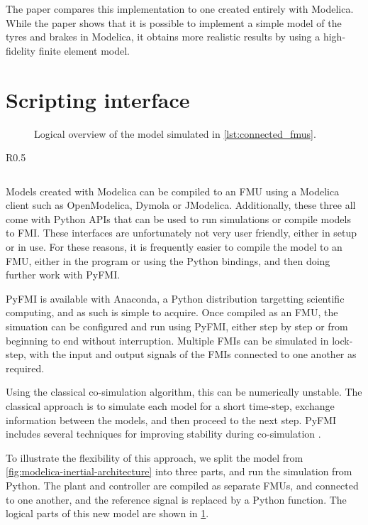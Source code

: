 \documentclass[\rootfolder/main.tex]{subfiles}
\begin{document}
The paper compares this implementation to one created entirely with Modelica.
While the paper shows that it is possible to implement a simple model of the tyres and brakes in Modelica, it obtains more realistic results by using a high-fidelity finite element model.

\section{Scripting interface}

\begin{figure}[H]
    \caption{Logical overview of the model simulated in \cref{lst:connected_fmus}.\label{fig:fmi-connected}}
\end{figure}

\begin{wraptable}{R}{0.5\columnwidth}
    \inputminted[firstline=3, lastline=30]{Python}{\rootfolder/Chapters/Chapter2/Listings/simulate.py}
\end{wraptable}

Models created with Modelica can be compiled to an FMU using a Modelica client such as OpenModelica, Dymola or JModelica.
Additionally, these three all come with Python APIs that can be used to run simulations or compile models to FMI.
These interfaces are unfortunately not very user friendly, either in setup or in use.
For these reasons, it is frequently easier to compile the model to an FMU, either in the program or using the Python bindings, and then doing further work with PyFMI.

PyFMI is available with Anaconda, a Python distribution targetting scientific computing, and as such is simple to acquire.
Once compiled as an FMU, the simuation can be configured and run using PyFMI, either step by step or from beginning to end without interruption.
Multiple FMIs can be simulated in lock-step, with the input and output signals of the FMIs connected to one another as required.

Using the classical co-simulation algorithm, this can be numerically unstable.
The classical approach is to simulate each model for a short time-step, exchange information between the models, and then proceed to the next step.
PyFMI includes several techniques for improving stability during co-simulation \cite{Andersson2016}.

To illustrate the flexibility of this approach, we split the model from \cref{fig:modelica-inertial-architecture} into three parts, and run the simulation from Python.
The plant and controller are compiled as separate FMUs, and connected to one another, and the reference signal is replaced by a Python function.
The logical parts of this new model are shown in \cref{fig:fmi-connected}.
\end{document}
